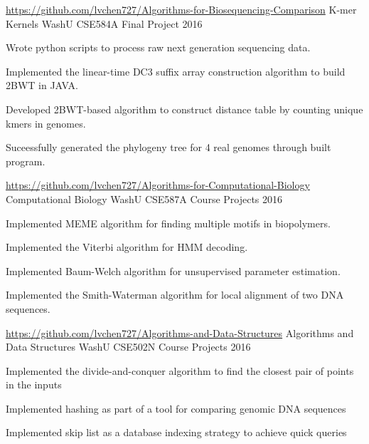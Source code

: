 \begin{cventries}
 \cventry
  	{\url{https://github.com/lvchen727/Algorithms-for-Biosequencing-Comparison}} %
    {K-mer Kernels}%
    {WashU CSE584A Final Project} %
    {2016} %
    {
      \begin{cvitems} %
        \item{Wrote python scripts to process raw next generation sequencing data.}
        \item {Implemented the linear-time DC3 suffix array construction algorithm to build 2BWT in JAVA.}
        \item {Developed 2BWT-based algorithm to construct distance table by counting unique kmers in genomes. }
        \item {Suceessfully generated the phylogeny tree for 4 real genomes through built program.}
      \end{cvitems}
    }
 \cventry
  	{\url{https://github.com/lvchen727/Algorithms-for-Computational-Biology}} %
    {Computational Biology}%
    {WashU CSE587A Course Projects} %
    {2016} %
    {
      \begin{cvitems} %
        \item{Implemented MEME algorithm for finding multiple motifs in biopolymers.}
        \item{Implemented the Viterbi algorithm for HMM decoding. }
        \item{Implemented Baum-Welch algorithm for unsupervised parameter estimation.}
        \item{Implemented the Smith-Waterman algorithm for local alignment of two DNA sequences.}
      \end{cvitems}
    }
 \cventry
  	{\url{https://github.com/lvchen727/Algorithms-and-Data-Structures}} %
    {Algorithms and Data Structures}%
    {WashU CSE502N Course Projects} %
    {2016} %
    {
      \begin{cvitems} %
        \item{Implemented the divide-and-conquer algorithm to find the closest pair of points in the inputs}
        \item{Implemented hashing as part of a tool for comparing genomic DNA sequences }
        \item{Implemented skip list as a database indexing strategy to achieve quick queries}
      \end{cvitems}
    }


\end{cventries}
